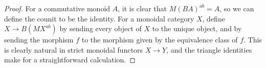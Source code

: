 \documentclass{amsbook} %
\newenvironment{eq*}{\begin{equation*}}{\end{equation*}}
\numberwithin{section}{chapter}
\begin{document}
\begin{proof}
For a commutative monoid $A$, it is clear that $M(BA)^{ab} = A$, so we can define the counit to be the identity. For a monoidal category $X$, define $X \to B(MX^{ab})$ by sending every object of $X$ to the unique object, and by sending the morphism $f$ to the morphism given by the equivalence class of $f$. This is clearly natural in strict monoidal functors $X \to Y$, and the triangle identities make for a straightforward calculation.




\end{proof}
\end{document}
